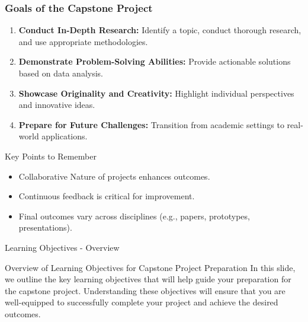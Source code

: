 \documentclass[aspectratio=169]{beamer}
\begin{document}
\begin{frame}[fragile]
    \frametitle{Goals of the Capstone Project}
    \begin{enumerate}
        \item \textbf{Conduct In-Depth Research:} Identify a topic, conduct thorough research, and use appropriate methodologies.
        \item \textbf{Demonstrate Problem-Solving Abilities:} Provide actionable solutions based on data analysis.
        \item \textbf{Showcase Originality and Creativity:} Highlight individual perspectives and innovative ideas.
        \item \textbf{Prepare for Future Challenges:} Transition from academic settings to real-world applications.
    \end{enumerate}
    
    \begin{block}{Key Points to Remember}
        \begin{itemize}
            \item Collaborative Nature of projects enhances outcomes.
            \item Continuous feedback is critical for improvement.
            \item Final outcomes vary across disciplines (e.g., papers, prototypes, presentations).
        \end{itemize}
    \end{block}
\end{frame}

\begin{frame}[fragile]{Learning Objectives - Overview}
    \begin{block}{Overview of Learning Objectives for Capstone Project Preparation}
        In this slide, we outline the key learning objectives that will help guide your preparation for the capstone project. Understanding these objectives will ensure that you are well-equipped to successfully complete your project and achieve the desired outcomes.
    \end{block}
\end{frame}
\end{document}
